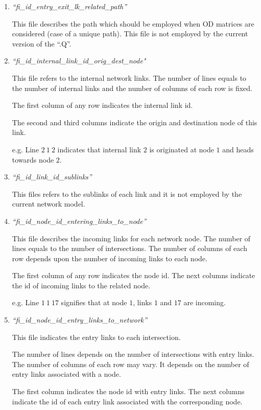 \documentclass[10pt, conference, compsocconf]{IEEEtran}
\begin{document}
\begin{enumerate}
\item \emph{``fi\_id\_entry\_exit\_lk\_related\_path''} 

This file  describes the path which should be employed when OD matrices are considered (case of a unique path). This file is not employed by the   current version of the ``.Q''.


\item \emph{``fi\_id\_internal\_link\_id\_orig\_dest\_node"}

This file refers to the internal network links. The number of lines equals to the number of internal links and the number of columns of each row is fixed.

The first column of any row indicates the internal  link id.

The second and third columns indicate the origin and destination node of this link.

e.g. Line $2	\ 1	\ 2$ indicates that internal link $2$ is originated at node $1$ and heads towards node $2$.

\item \emph{``fi\_id\_link\_id\_sublinks''}

This files refers to the  sublinks of each link and it is not employed by the current network model. 

\item \emph{``fi\_id\_node\_id\_entering\_links\_to\_node''}

This file describes the incoming links for each network node.
The number of lines equals to the number of intersections. 
The number of columns of each row depends upon the number of incoming links to each node.

The first column of any row indicates the node id. The next columns indicate the id of  incoming links to  the related node.

e.g. Line $1	\ 1	\ 17	$ signifies that at node $1$, links $1$ and $17$ are incoming.

\item \emph{``fi\_id\_node\_id\_entry\_links\_to\_network''} 

This file indicates the entry links to each intersection.

The number of lines depends  on the number of intersections with entry links. 
The number of columns of each row may vary. It depends on the number of entry links associated with a node. 

The first column indicates the node id with entry links. The next columns indicate the id of each entry link associated with the corresponding node.


\end{enumerate}
\end{document}

